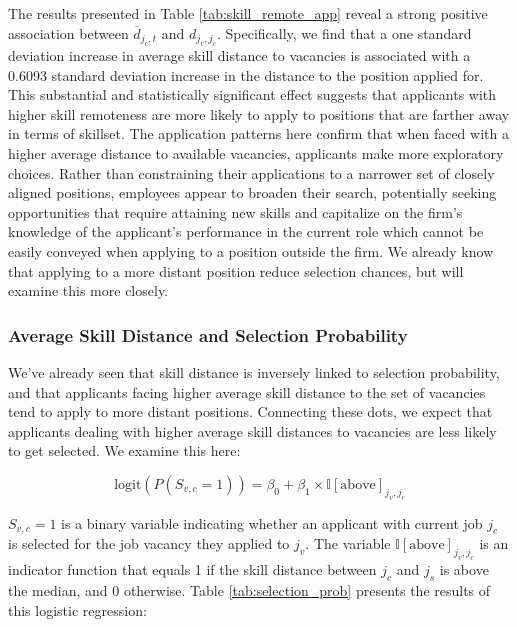 \documentclass[12pt]{article}
\begin{document}
The results presented in Table \ref{tab:skill_remote_app} reveal a strong positive association between $\overline{d}_{j_c, t}$ and $d_{j_v, j_c}$. Specifically, we find that a one standard deviation increase in average skill distance to vacancies is associated with a 0.6093 standard deviation increase in the distance to the position applied for. This substantial and statistically significant effect suggests that applicants with higher skill remoteness are more likely to apply to positions that are farther away in terms of skillset. The application patterns here confirm that when faced with a higher average distance to available vacancies, applicants make more exploratory choices. Rather than constraining their applications to a narrower set of closely aligned positions, employees appear to broaden their search, potentially seeking opportunities that require attaining new skills and capitalize on the firm's knowledge of the applicant's performance in the current role which cannot be easily conveyed when applying to a position outside the firm. We already know that applying to a more distant position reduce selection chances, but will examine this more closely. 




\subsubsection{Average Skill Distance and Selection Probability}

We've already seen that skill distance is inversely linked to selection probability, and that applicants facing higher average skill distance to the set of vacancies tend to apply to more distant positions. Connecting these dots, we expect that applicants dealing with higher average skill distances to vacancies are less likely to get selected. We examine this here:


\begin{equation}
\text{logit}(P(S_{v,c} = 1)) = \beta_0 + \beta_1 \times \mathbb{I}[\text{above}]_{j_v,j_c}
\end{equation} 

$S_{v,c} = 1$ is a binary variable indicating whether an applicant with current job $j_c$ is selected for the job vacancy they applied to $j_v$. The variable $\mathbb{I}[\text{above}]_{j_v,j_c}$ is an indicator function that equals 1 if the skill distance between $j_c$ and $j_s$ is above the median, and 0 otherwise. Table \ref{tab:selection_prob} presents the results of this logistic regression:
\end{document}
